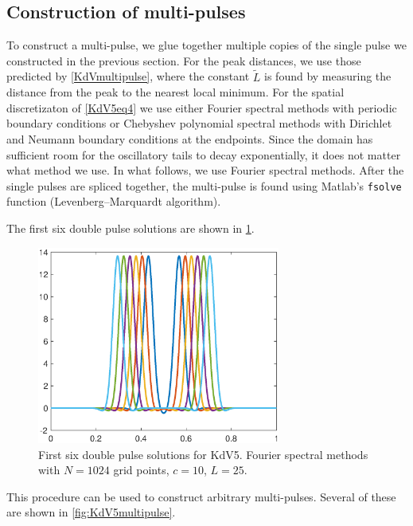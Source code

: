 \documentclass[thesis.tex]{subfiles}
\begin{document}
\subsection{Construction of multi-pulses}

To construct a multi-pulse, we glue together multiple copies of the single pulse we constructed in the previous section. For the peak distances, we use those predicted by \cref{KdVmultipulse}, where the constant $\tilde{L}$ is found by measuring the distance from the peak to the nearest local minimum. For the spatial discretizaton of \eqref{KdV5eq4} we use either Fourier spectral methods with periodic boundary conditions or Chebyshev polynomial spectral methods with Dirichlet and Neumann boundary conditions at the endpoints. Since the domain has sufficient room for the oscillatory tails to decay exponentially, it does not matter what method we use. In what follows, we use Fourier spectral methods. After the single pulses are spliced together, the multi-pulse is found using Matlab's \texttt{fsolve} function (Levenberg–Marquardt algorithm).

The first six double pulse solutions are shown in \cref{fig:KdV5doublepulse}.

\begin{figure}
\begin{center}
\includegraphics[width=8cm]{images/kdv5numerics/double10.eps}
\caption{First six double pulse solutions for KdV5. Fourier spectral methods with $N = 1024$ grid points, $c = 10$, $L = 25$.}
\label{fig:KdV5doublepulse}
\end{center}
\end{figure}

This procedure can be used to construct arbitrary multi-pulses. Several of these are shown in \cref{fig:KdV5multipulse}.
\end{document}

